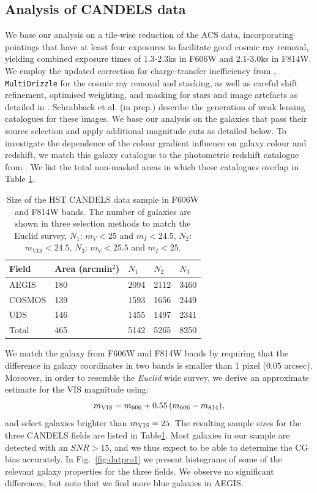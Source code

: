 \documentclass[useAMS,usenatbib]{mnras}
\newcommand{\be}{\begin{equation}}
\newcommand{\ee}{\end{equation}}
\begin{document}
\subsection{Analysis of CANDELS data}

We base our analysis on a tile-wise reduction of the ACS data, incorporating pointings that have at least four exposures to facilitate good cosmic ray removal, yielding combined exposure times of 1.3-2.3ks in F606W and 2.1-3.0ks in F814W.  We employ the updated correction for charge-transfer inefficiency from \cite{massey2014}, \texttt{MultiDrizzle} \citep{koekemoer2003} for the cosmic ray removal and stacking, as well as careful shift refinement, optimised weighting, and masking for stars and image artefacts as detailed in \cite{schrabback2010}.  Schrabback et al. (in prep.) describe the generation of weak lensing catalogues for these images.  We base our analysis on the galaxies that pass their source selection and apply
additional magnitude cuts as detailed below. To investigate the dependence of the colour gradient influence on galaxy colour and redshift, we match this galaxy catalogue to the photometric redshift catalogue from \cite{skelton14}.  We list the total non-masked areas in which these catalogues overlap in Table \ref{table:mag}.

\begin{center}
\begin{table}
  \begin{tabular}{lllll}
    \hline
    Field   &Area (arcmin$^2$) &$N_1$ &$N_2$ &$N_3$\\
    \hline
    AEGIS   &180   &2094  &2112  &3460\\
    COSMOS  &139   &1593  &1656  &2449\\
    UDS     &146   &1455  &1497  &2341\\
    Total   &465   &5142  &5265  &8250\\
    \hline
  \end{tabular}
  \caption{\label{table:mag} Size of the HST CANDELS data sample in F606W
    and F814W bands.  The number of galaxies are shown in three selection
    methods to match the Euclid survey, $N_1$: $m_V<25$ and $m_I<24.5$,
    $N_2$: $m_{VIS}<24.5$, $N_3$: $m_V<25.5$ and $m_I<25$. }
\end{table}
\end{center}
%

We match the galaxy from F606W and F814W bands by requiring that the difference in galaxy coordinates 
in two bands is smaller than 1 pixel ($0.05$ arcsec). Moreover, in order to resemble the {\it Euclid} 
wide survey, we derive an approximate estimate for the VIS magnitude using:
\be
m_{\rm VIS}=m_{606}+ 0.55\,(m_{606}-m_{814}),
\ee
and select galaxies brighter than $m_{\rm VIS}=25$. The resulting sample sizes for the 
three CANDELS fields are listed in Table\ref{table:mag}. Most galaxies in our sample are detected with an $SNR>15$, and we thus  expect to be able to determine the CG bias accurately. In Fig.~\ref{fig:datpro1} we present histograms of some of the relevant galaxy properties for the three fields. We observe no significant differences, but note that we find more blue galaxies in AEGIS.
\end{document}
